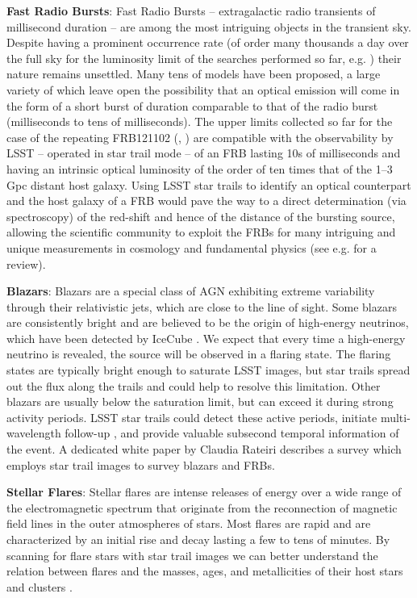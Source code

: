 \documentclass[12pt, letterpaper]{article}
\begin{document}
{\bf Fast Radio Bursts}: Fast Radio Bursts – extragalactic radio transients of millisecond duration – are among the most intriguing objects in the transient sky. Despite having a prominent occurrence rate (of order many thousands a day over the full sky for the luminosity limit of the searches performed so far, e.g. \citealt{keane}) their nature remains unsettled. Many tens of models have been proposed, a large variety of which leave open the possibility that an optical emission will come in the form of a short burst of duration comparable to that of the radio burst (milliseconds to tens of milliseconds). The upper limits collected so far for the case of the repeating FRB121102 (\citealt{2017MNRAS.472.2800H}, \citealt{2018MNRAS.481.2479M}) are compatible with the observability by LSST – operated in star trail mode – of an FRB lasting 10s of milliseconds and having an intrinsic optical luminosity of the order of ten times that of the 1--3 Gpc distant host galaxy. Using LSST star trails to identify an optical counterpart and the host galaxy of a FRB would pave the way to a direct determination (via spectroscopy) of the red-shift and hence of the distance of the bursting source, allowing the scientific community to exploit the FRBs for many intriguing and unique measurements in cosmology and fundamental physics (see e.g. \citealt{2018NatAs...2..836M} for a review).

{\bf Blazars}: Blazars are a special class of AGN exhibiting extreme variability through their relativistic jets, which are close to the line of sight. Some blazars are consistently bright and are believed to be the origin of high-energy neutrinos, which have been detected by IceCube \citep{2018MNRAS.tmp.2928R}. We expect that every time a high-energy neutrino is revealed, the source will be observed in a flaring state. The flaring states are typically bright enough to saturate LSST images, but star trails spread out the flux along the trails and could help to resolve this limitation. Other blazars are usually below the saturation limit, but can exceed it during strong activity periods. LSST star trails could detect these active periods, initiate multi-wavelength follow-up \citep{2012AA...545A..48R}, and provide valuable subsecond temporal information of the event. A dedicated white paper by Claudia Rateiri describes a survey which employs star trail images to survey blazars and FRBs.

{\bf Stellar Flares}: Stellar flares are intense releases of energy over a wide range of the electromagnetic spectrum that originate from the reconnection of magnetic field lines in the outer atmospheres of stars. Most flares are rapid and are characterized by an initial rise and decay lasting a few to tens of minutes. By scanning for flare stars with star trail images we can better understand the relation between flares and the masses, ages, and metallicities of their host stars and clusters \citep{2018arXiv180904510S, 2017ApJ...849...36Y}. 
\end{document}
